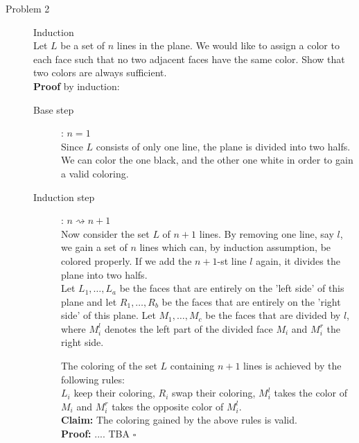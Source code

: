 \documentclass[11pt,a4paper,ngerman]{article}
\begin{document}
\begin{description}
\item[Problem 2] Induction \\
Let $L$ be a set of $n$ lines in the plane. We would like to assign a color to each face such that no two adjacent faces have the same color. Show that two colors are always sufficient.\\

\textbf{Proof} by induction:
\begin{description}
\item[Base step]: $n = 1$ \\
Since $L$ consists of only one line, the plane is divided into two halfs. We can color the one black,
and the other one white in order to gain a valid coloring.
\item[Induction step]: $n \rightsquigarrow n + 1$ \\
Now consider the set $L$ of $n+1$ lines. By removing one line, say $l$, we gain a set of $n$ lines
which can, by induction assumption, be colored properly. If we add the $n+1$-st line $l$ again,
it divides the plane into two halfs.\\
Let $L_1,\ldots,L_a$ be the faces that are entirely on the
'left side' of this plane and let $R_1,\ldots,R_b$ be the faces that are entirely on the
'right side' of this plane. Let $M_1,\ldots,M_c$ be the faces that are divided by $l$, where $M_i^l$
denotes the left part of the divided face $M_i$ and $M_i^r$ the right side.

The coloring of the set $L$ containing $n+1$ lines is achieved by the following rules:\\
$L_i$ keep their coloring, $R_i$ swap their coloring, $M_i^l$ takes the color of $M_i$ and $M_i^r$ takes
the opposite color of $M_i^l$.\\
\textbf{Claim:} The coloring gained by the above rules is valid.\\
\textbf{Proof:} .... TBA 
\mbox{} \hfill $\square$
\end{description}
  



\end{description}
\end{document}
